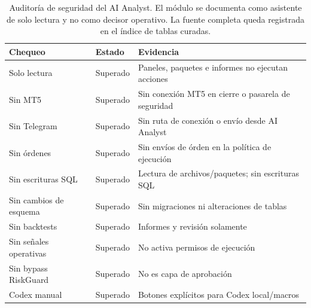 \begin{table}[H]
\centering
\scriptsize
\setlength{\tabcolsep}{4pt}
\begin{tabular}{p{}p{}p{}}
\hline
Chequeo & Estado & Evidencia \\
\hline
Solo lectura & Superado & Paneles, paquetes e informes no ejecutan acciones \\
Sin MT5 & Superado & Sin conexi\'on MT5 en cierre o pasarela de seguridad \\
Sin Telegram & Superado & Sin ruta de conexi\'on o env\'io desde AI Analyst \\
Sin \'ordenes & Superado & Sin env\'ios de \'orden en la pol\'itica de ejecuci\'on \\
Sin escrituras SQL & Superado & Lectura de archivos/paquetes; sin escrituras SQL \\
Sin cambios de esquema & Superado & Sin migraciones ni alteraciones de tablas \\
Sin backtests & Superado & Informes y revisi\'on solamente \\
Sin se\~nales operativas & Superado & No activa permisos de ejecuci\'on \\
Sin bypass RiskGuard & Superado & No es capa de aprobaci\'on \\
Codex manual & Superado & Botones expl\'icitos para Codex local/macros \\
\hline
\end{tabular}
\caption[Auditor\'ia de seguridad del AI Analyst]{Auditor\'ia de seguridad del AI Analyst. El m\'odulo se documenta como asistente de solo lectura y no como decisor operativo. La fuente completa queda registrada en el \'indice de tablas curadas.}
\label{tab:ai-analyst-safety}
\end{table}
